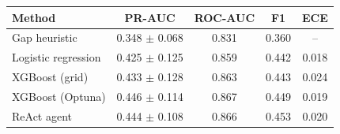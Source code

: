 \begin{tabular}{lcccc}\toprule
Method & PR-AUC & ROC-AUC & F1 & ECE \\\midrule
Gap heuristic & 0.348 $\pm$ 0.068 & 0.831 & 0.360 & -- \\
Logistic regression & 0.425 $\pm$ 0.125 & 0.859 & 0.442 & 0.018 \\
XGBoost (grid) & 0.433 $\pm$ 0.128 & 0.863 & 0.443 & 0.024 \\
XGBoost (Optuna) & 0.446 $\pm$ 0.114 & 0.867 & 0.449 & 0.019 \\
ReAct agent & 0.444 $\pm$ 0.108 & 0.866 & 0.453 & 0.020 \\
\bottomrule\end{tabular}
